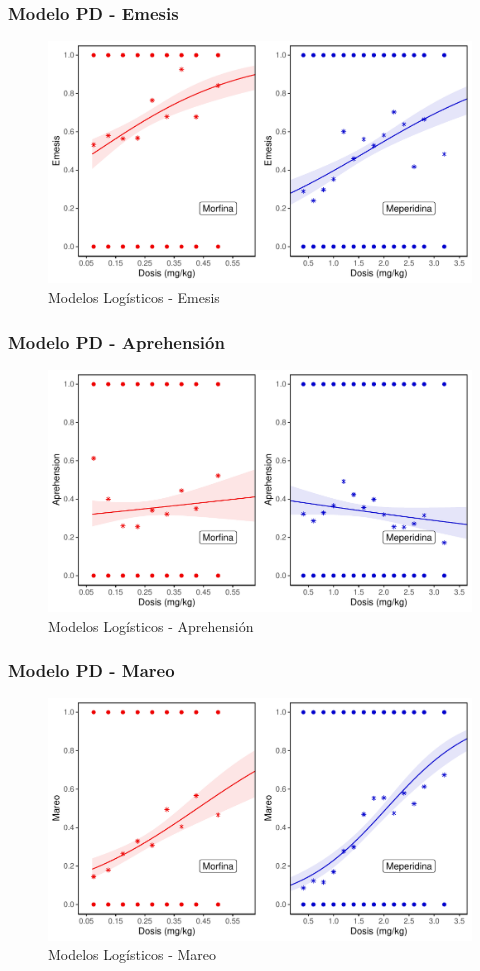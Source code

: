 \documentclass[10pt]{beamer}
\begin{document}
	\begin{frame}
	\frametitle{Modelo PD - Emesis}
	\begin{figure}[H]
		\centering
		\includegraphics[width=0.9\linewidth]{Figuras/Emesis}
		\caption[Modelos Logísticos - Emesis]{Modelos Logísticos - Emesis}
		\label{fig:2}
	\end{figure}
	\end{frame}

	\begin{frame}
	\frametitle{Modelo PD - Aprehensión}
	\begin{figure}[H]
		\centering
		\includegraphics[width=0.9\linewidth]{Figuras/Aprehension}
		\caption[Modelos Logísticos - Aprehensión]{Modelos Logísticos - Aprehensión}
		\label{fig:3}
	\end{figure}
\end{frame}

\begin{frame}
	\frametitle{Modelo PD - Mareo}
	\begin{figure}[H]
		\centering
		\includegraphics[width=0.9\linewidth]{Figuras/Mareo}
		\caption[Modelos Logísticos - Mareo]{Modelos Logísticos - Mareo}
		\label{fig:4}
	\end{figure}
\end{frame}
\end{document}
